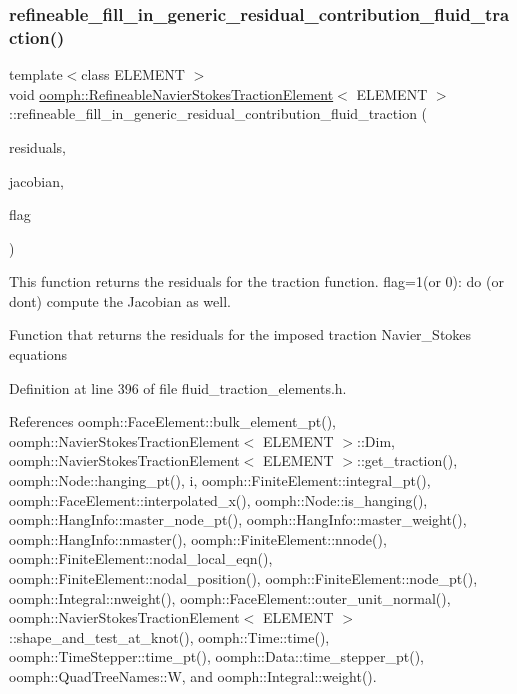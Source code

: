\subsubsection{\texorpdfstring{refineable\+\_\+fill\+\_\+in\+\_\+generic\+\_\+residual\+\_\+contribution\+\_\+fluid\+\_\+traction()}{refineable\_fill\_in\_generic\_residual\_contribution\_fluid\_traction()}}
{\footnotesize\ttfamily template$<$class E\+L\+E\+M\+E\+NT $>$ \\
void \hyperlink{classoomph_1_1RefineableNavierStokesTractionElement}{oomph\+::\+Refineable\+Navier\+Stokes\+Traction\+Element}$<$ E\+L\+E\+M\+E\+NT $>$\+::refineable\+\_\+fill\+\_\+in\+\_\+generic\+\_\+residual\+\_\+contribution\+\_\+fluid\+\_\+traction (\begin{DoxyParamCaption}\item[{\hyperlink{classoomph_1_1Vector}{Vector}$<$ double $>$ \&}]{residuals,  }\item[{\hyperlink{classoomph_1_1DenseMatrix}{Dense\+Matrix}$<$ double $>$ \&}]{jacobian,  }\item[{unsigned}]{flag }\end{DoxyParamCaption})\hspace{0.3cm}{\ttfamily [protected]}}



This function returns the residuals for the traction function. flag=1(or 0)\+: do (or don\textquotesingle{}t) compute the Jacobian as well. 

Function that returns the residuals for the imposed traction Navier\+\_\+\+Stokes equations 

Definition at line 396 of file fluid\+\_\+traction\+\_\+elements.\+h.



References oomph\+::\+Face\+Element\+::bulk\+\_\+element\+\_\+pt(), oomph\+::\+Navier\+Stokes\+Traction\+Element$<$ E\+L\+E\+M\+E\+N\+T $>$\+::\+Dim, oomph\+::\+Navier\+Stokes\+Traction\+Element$<$ E\+L\+E\+M\+E\+N\+T $>$\+::get\+\_\+traction(), oomph\+::\+Node\+::hanging\+\_\+pt(), i, oomph\+::\+Finite\+Element\+::integral\+\_\+pt(), oomph\+::\+Face\+Element\+::interpolated\+\_\+x(), oomph\+::\+Node\+::is\+\_\+hanging(), oomph\+::\+Hang\+Info\+::master\+\_\+node\+\_\+pt(), oomph\+::\+Hang\+Info\+::master\+\_\+weight(), oomph\+::\+Hang\+Info\+::nmaster(), oomph\+::\+Finite\+Element\+::nnode(), oomph\+::\+Finite\+Element\+::nodal\+\_\+local\+\_\+eqn(), oomph\+::\+Finite\+Element\+::nodal\+\_\+position(), oomph\+::\+Finite\+Element\+::node\+\_\+pt(), oomph\+::\+Integral\+::nweight(), oomph\+::\+Face\+Element\+::outer\+\_\+unit\+\_\+normal(), oomph\+::\+Navier\+Stokes\+Traction\+Element$<$ E\+L\+E\+M\+E\+N\+T $>$\+::shape\+\_\+and\+\_\+test\+\_\+at\+\_\+knot(), oomph\+::\+Time\+::time(), oomph\+::\+Time\+Stepper\+::time\+\_\+pt(), oomph\+::\+Data\+::time\+\_\+stepper\+\_\+pt(), oomph\+::\+Quad\+Tree\+Names\+::W, and oomph\+::\+Integral\+::weight().



